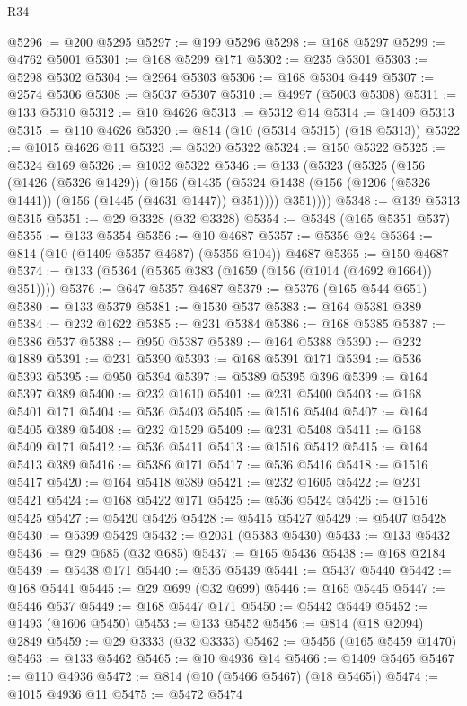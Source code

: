 \begin{lexlean}{R34}
\begin{coremodule}
@5296 := @200 @5295
@5297 := @199 @5296
@5298 := @168 @5297
@5299 := @4762 @5001
@5301 := @168 @5299 @171
@5302 := @235 @5301
@5303 := @5298 @5302
@5304 := @2964 @5303
@5306 := @168 @5304 @449
@5307 := @2574 @5306
@5308 := @5037 @5307
@5310 := @4997 (@5003 @5308)
@5311 := @133 @5310
@5312 := @10 @4626
@5313 := @5312 @14
@5314 := @1409 @5313
@5315 := @110 @4626
@5320 := @814 (@10 (@5314 @5315) (@18 @5313))
@5322 := @1015 @4626 @11
@5323 := @5320 @5322
@5324 := @150 @5322
@5325 := @5324 @169
@5326 := @1032 @5322
@5346 := @133
    (@5323
      (@5325
        (@156
          (@1426 (@5326 @1429))
          (@156
            (@1435 (@5324 @1438 (@156 (@1206 (@5326 @1441)) (@156 (@1445 (@4631 @1447)) @351))))
            @351))))
@5348 := @139 @5313 @5315
@5351 := @29 @3328 (@32 @3328)
@5354 := @5348 (@165 @5351 @537)
@5355 := @133 @5354
@5356 := @10 @4687
@5357 := @5356 @24
@5364 := @814 (@10 (@1409 @5357 @4687) (@5356 @104)) @4687
@5365 := @150 @4687
@5374 := @133 (@5364 (@5365 @383 (@1659 (@156 (@1014 (@4692 @1664)) @351))))
@5376 := @647 @5357 @4687
@5379 := @5376 (@165 @544 @651)
@5380 := @133 @5379
@5381 := @1530 @537
@5383 := @164 @5381 @389
@5384 := @232 @1622
@5385 := @231 @5384
@5386 := @168 @5385
@5387 := @5386 @537
@5388 := @950 @5387
@5389 := @164 @5388
@5390 := @232 @1889
@5391 := @231 @5390
@5393 := @168 @5391 @171
@5394 := @536 @5393
@5395 := @950 @5394
@5397 := @5389 @5395 @396
@5399 := @164 @5397 @389
@5400 := @232 @1610
@5401 := @231 @5400
@5403 := @168 @5401 @171
@5404 := @536 @5403
@5405 := @1516 @5404
@5407 := @164 @5405 @389
@5408 := @232 @1529
@5409 := @231 @5408
@5411 := @168 @5409 @171
@5412 := @536 @5411
@5413 := @1516 @5412
@5415 := @164 @5413 @389
@5416 := @5386 @171
@5417 := @536 @5416
@5418 := @1516 @5417
@5420 := @164 @5418 @389
@5421 := @232 @1605
@5422 := @231 @5421
@5424 := @168 @5422 @171
@5425 := @536 @5424
@5426 := @1516 @5425
@5427 := @5420 @5426
@5428 := @5415 @5427
@5429 := @5407 @5428
@5430 := @5399 @5429
@5432 := @2031 (@5383 @5430)
@5433 := @133 @5432
@5436 := @29 @685 (@32 @685)
@5437 := @165 @5436
@5438 := @168 @2184
@5439 := @5438 @171
@5440 := @536 @5439
@5441 := @5437 @5440
@5442 := @168 @5441
@5445 := @29 @699 (@32 @699)
@5446 := @165 @5445
@5447 := @5446 @537
@5449 := @168 @5447 @171
@5450 := @5442 @5449
@5452 := @1493 (@1606 @5450)
@5453 := @133 @5452
@5456 := @814 (@18 @2094) @2849
@5459 := @29 @3333 (@32 @3333)
@5462 := @5456 (@165 @5459 @1470)
@5463 := @133 @5462
@5465 := @10 @4936 @14
@5466 := @1409 @5465
@5467 := @110 @4936
@5472 := @814 (@10 (@5466 @5467) (@18 @5465))
@5474 := @1015 @4936 @11
@5475 := @5472 @5474

\end{coremodule}
\end{lexlean}
